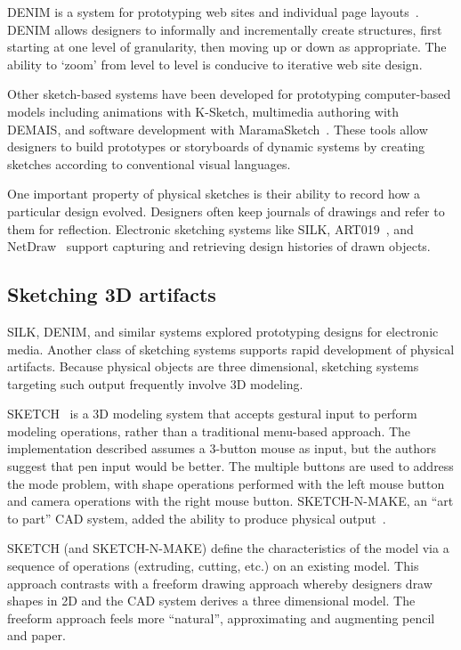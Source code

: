 DENIM is a system for prototyping web sites and individual page
layouts~\cite{lin-denim}. DENIM allows designers to informally and
incrementally create structures, first starting at one level of
granularity, then moving up or down as appropriate. The ability to
`zoom' from level to level is conducive to iterative web site design.

Other sketch-based systems have been developed for prototyping
computer-based models including animations with K-Sketch, multimedia
authoring with DEMAIS, and software development with
MaramaSketch~\cite{davis-k-sketch,bailey-demais,grundy-maramasketch}. These
tools allow designers to build prototypes or storyboards of dynamic
systems by creating sketches according to conventional visual
languages.

One important property of physical sketches is their ability to record
how a particular design evolved. Designers often keep journals of
drawings and refer to them for reflection. Electronic sketching
systems like SILK, ART019~\cite{yamamoto-art019}, and
NetDraw~\cite{qian-netdraw} support capturing and retrieving design
histories of drawn objects.

\subsection{Sketching 3D artifacts}
\label{sec:interaction-prototype-fab}

SILK, DENIM, and similar systems explored prototyping designs for
electronic media. Another class of sketching systems supports rapid
development of physical artifacts. Because physical objects are three
dimensional, sketching systems targeting such output frequently
involve 3D modeling.

SKETCH~\cite{zeleznik-sketch} is a 3D modeling system that
accepts gestural input to perform modeling operations, rather than a
traditional menu-based approach. The implementation described assumes
a 3-button mouse as input, but the authors suggest that pen input
would be better. The multiple buttons are used to address the mode
problem, with shape operations performed with the left mouse button
and camera operations with the right mouse button. SKETCH-N-MAKE, an
``art to part'' CAD system, added the ability to produce physical
output~\cite{bloomenthal-sketch-n-make}.

SKETCH (and SKETCH-N-MAKE) define the characteristics of the model via
a sequence of operations (extruding, cutting, etc.) on an existing
model. This approach contrasts with a freeform drawing approach
whereby designers draw shapes in 2D and the CAD system derives a three
dimensional model. The freeform approach feels more ``natural'',
approximating and augmenting pencil and paper.

